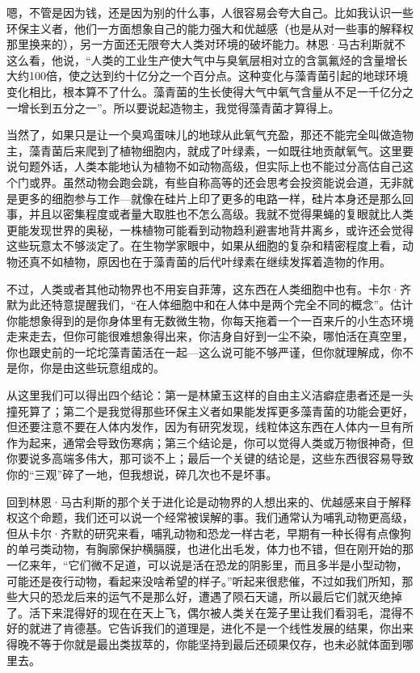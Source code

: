 嗯，不管是因为钱，还是因为别的什么事，人很容易会夸大自己。比如我认识一些环保主义者，他们一方面想象自己的能力强大和优越感（也是从对一些事的解释权那里换来的），另一方面还无限夸大人类对环境的破坏能力。林恩·马古利斯就不这么看，他说，``人类的工业生产使大气中与臭氧层相对立的含氯氟烃的含量增长大约100倍，使之达到约十亿分之一个百分点。这种变化与藻青菌引起的地球环境变化相比，根本算不了什么。藻青菌的生长使得大气中氧气含量从不足一千亿分之一增长到五分之一''。所以要说起造物主，我觉得藻青菌才算得上。

当然了，如果只是让一个臭鸡蛋味儿的地球从此氧气充盈，那还不能完全叫做造物主，藻青菌后来爬到了植物细胞内，就成了叶绿素，一如既往地贡献氧气。这里要说句题外话，人类本能地认为植物不如动物高级，但实际上也不能过分高估自己这个门或界。虽然动物会跑会跳，有些自称高等的还会思考会投资能说会道，无非就是更多的细胞参与工作---就像在硅片上印了更多的电路一样，硅片本身还是那么回事，并且以密集程度或者量大取胜也不怎么高级。我就不觉得果蝇的复眼就比人类更能发现世界的奥秘，一株植物可能看到动物趋利避害地背井离乡，或许还会觉得这些玩意太不够淡定了。在生物学家眼中，如果从细胞的复杂和精密程度上看，动物还真不如植物，原因也在于藻青菌的后代叶绿素在继续发挥着造物的作用。

不过，人类或者其他动物界也不用妄自菲薄，这东西在人类细胞中也有。卡尔·齐默为此还特意提醒我们，``在人体细胞中和在人体中是两个完全不同的概念''。估计你能想象得到的是你身体里有无数微生物，你每天拖着一个一百来斤的小生态环境走来走去，但你可能很难想象得出来，你洁身自好到一尘不染，哪怕活在真空里，你也跟史前的一坨坨藻青菌活在一起---这么说可能不够严谨，但你就理解成，你不是你，你是由这些玩意组成的。

从这里我们可以得出四个结论：第一是林黛玉这样的自由主义洁癖症患者还是一头撞死算了；第二个是我觉得那些环保主义者如果能发挥更多藻青菌的功能会更好，但还要注意不要在人体内发作，因为有研究发现，线粒体这东西在人体内一旦有所作为起来，通常会导致伤寒病；第三个结论是，你可以觉得人类或万物很神奇，但你要说多高端多伟大，那可谈不上；最后一个关键的结论是，这些东西很容易导致你的``三观''碎了一地，但我想说，碎几次也不是坏事。

回到林恩·马古利斯的那个关于进化论是动物界的人想出来的、优越感来自于解释权这个命题，我们还可以说一个经常被误解的事。我们通常认为哺乳动物更高级，但从卡尔·齐默的研究来看，哺乳动物和恐龙一样古老，早期有一种长得有点像狗的单弓类动物，有胸廓保护横膈膜，也进化出毛发，体力也不错，但在刚开始的那一亿来年，``它们微不足道，可以说是活在恐龙的阴影里，而且多半是小型动物，可能还是夜行动物，看起来没啥希望的样子。''听起来很悲催，不过如我们所知，那些大只的恐龙后来的运气不是那么好，遭遇了陨石天谴，所以最后它们就灭绝掉了。活下来混得好的现在在天上飞，偶尔被人类关在笼子里让我们看羽毛，混得不好的就进了肯德基。它告诉我们的道理是，进化不是一个线性发展的结果，你出来得晚不等于你就是最出类拔萃的，你能坚持到最后还硕果仅存，也未必就体面到哪里去。

